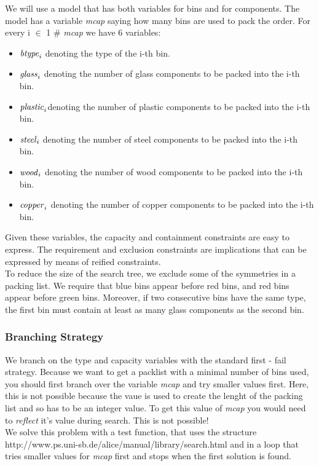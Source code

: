 \documentclass[a4paper]{scrartcl}
\begin{document}
We will use a model that has both variables for bins and for
components. The model has a variable {\it mcap} saying how many 
bins are used to pack the order. For every i $\in$ 1 $\#$
{\it mcap} we have 6 variables:
\begin{itemize}
\item
${\it btype}_i$ denoting the type of the i-th bin.
\item
${\it glass}_i$ denoting the number of glass components to be packed into the i-th bin.
\item
${\it plastic}_i $denoting the number of plastic components to be packed into the i-th bin.
\item
${\it steel}_i $ denoting the number of steel components to be packed into the i-th bin.
\item
${\it wood}_i $ denoting the number of wood components to be packed into the i-th bin.
\item
${\it copper}_i $ denoting the number of copper components to be packed into the i-th bin.
\end{itemize}
Given these variables, the capacity and containment constraints 
are easy to express. The requirement and exclusion constraints are 
implications that can be expressed by means of reified constraints.\\

To reduce the size of the search tree, we exclude some of the symmetries 
in a packing list. We require that blue bins appear before red bins, 
and red bins appear before green bins. Moreover, if two consecutive 
bins have the same type, the first bin must contain at least as many 
glass components as the second bin.

\subsubsection{Branching Strategy}
 
We branch on the type and capacity variables with
the standard first - fail strategy. Because we want to get a 
packlist with a minimal number of bins used, you should first
branch over the variable {\it mcap} and try smaller values
first. Here, this is not possible because the vaue is used
to create the lenght of the packing list and so has to be an
integer value. To get this value of {\it mcap} you would need to
{\it reflect} it's value during search. This is not possible!\\
We solve this problem with a test function, that uses the structure
\htmladdnormallink{\textcolor{blue}{Search}}
{http://www.ps.uni-sb.de/alice/manual/library/search.html} and
in a loop that tries smaller values for {\it mcap} first and
stops when the first solution is found.
\end{document}
